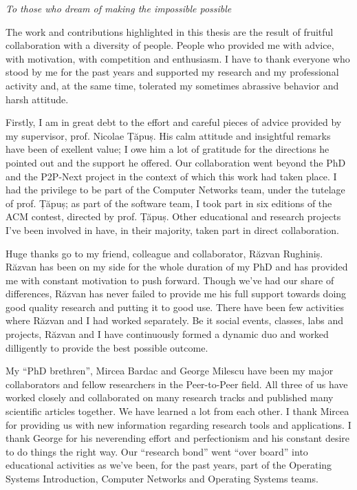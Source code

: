 \vspace*{7cm}
\begin{center}
\textit{To those who dream of making the impossible possible}
\end{center}

\newpage

The work and contributions highlighted in this thesis are the result of
fruitful collaboration with a diversity of people. People who provided me
with advice, with motivation, with competition and enthusiasm. I have to thank
everyone who stood by me for the past years and supported my research and my
professional activity and, at the same time, tolerated my sometimes abrassive
behavior and harsh attitude.

Firstly, I am in great debt to the effort and careful pieces of advice
provided by my supervisor, prof. Nicolae Țăpuș. His calm attitude and
insightful remarks have been of exellent value; I owe him a lot of gratitude
for the directions he pointed out and the support he offered. Our
collaboration went beyond the PhD and the P2P-Next project in the context of
which this work had taken place. I had the privilege to be part of the
Computer Networks team, under the tutelage of prof. Țăpuș; as part of the
software team, I took part in six editions of the ACM contest, directed by
prof. Țăpuș. Other educational and research projects I've been involved in
have, in their majority, taken part in direct collaboration.

Huge thanks go to my friend, colleague and collaborator, Răzvan Rughiniș.
Răzvan has been on my side for the whole duration of my PhD and has provided
me with constant motivation to push forward. Though we've had our share of
differences, Răzvan has never failed to provide me his full support towards
doing good quality research and putting it to good use. There have been few
activities where Răzvan and I had worked separately. Be it social events,
classes, labs and projects, Răzvan and I have continuously formed a dynamic
duo and worked dilligently to provide the best possible outcome.

My ``PhD brethren'', Mircea Bardac and George Milescu have been my major
collaborators and fellow researchers in the Peer-to-Peer field. All three of
us have worked closely and collaborated on many research tracks and published
many scientific articles together. We have learned a lot from each other. I
thank Mircea for providing us with new information regarding research tools
and applications. I thank George for his neverending effort and perfectionism
and his constant desire to do things the right way. Our ``research bond'' went
``over board'' into educational activities as we've been, for the past
years, part of the Operating Systems Introduction, Computer Networks and
Operating Systems teams.

